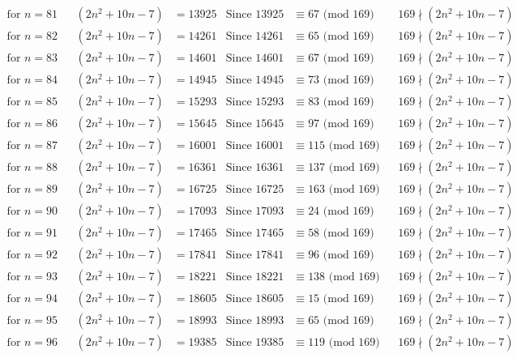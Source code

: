 \documentclass[12pt]{article}
\begin{document}
\begin{align*}
\text{for $n = 81 $}&& (2n^2+10n-7) &= 13925 & \text{Since } 13925  &\equiv  67 \text{ (mod $169$)}&& 169 \nmid (2n^2+10n-7)\\
\text{for $n = 82 $}&& (2n^2+10n-7) &= 14261 & \text{Since } 14261  &\equiv  65 \text{ (mod $169$)}&& 169 \nmid (2n^2+10n-7)\\
\text{for $n = 83 $}&& (2n^2+10n-7) &= 14601 & \text{Since } 14601  &\equiv  67 \text{ (mod $169$)}&& 169 \nmid (2n^2+10n-7)\\
\text{for $n = 84 $}&& (2n^2+10n-7) &= 14945 & \text{Since } 14945  &\equiv  73 \text{ (mod $169$)}&& 169 \nmid (2n^2+10n-7)\\
\text{for $n = 85 $}&& (2n^2+10n-7) &= 15293 & \text{Since } 15293  &\equiv  83 \text{ (mod $169$)}&& 169 \nmid (2n^2+10n-7)\\
\text{for $n = 86 $}&& (2n^2+10n-7) &= 15645 & \text{Since } 15645  &\equiv  97 \text{ (mod $169$)}&& 169 \nmid (2n^2+10n-7)\\
\text{for $n = 87 $}&& (2n^2+10n-7) &= 16001 & \text{Since } 16001  &\equiv  115 \text{ (mod $169$)}&& 169 \nmid (2n^2+10n-7)\\
\text{for $n = 88 $}&& (2n^2+10n-7) &= 16361 & \text{Since } 16361  &\equiv  137 \text{ (mod $169$)}&& 169 \nmid (2n^2+10n-7)\\
\text{for $n = 89 $}&& (2n^2+10n-7) &= 16725 & \text{Since } 16725  &\equiv  163 \text{ (mod $169$)}&& 169 \nmid (2n^2+10n-7)\\
\text{for $n = 90 $}&& (2n^2+10n-7) &= 17093 & \text{Since } 17093  &\equiv  24 \text{ (mod $169$)}&& 169 \nmid (2n^2+10n-7)\\
\text{for $n = 91 $}&& (2n^2+10n-7) &= 17465 & \text{Since } 17465  &\equiv  58 \text{ (mod $169$)}&& 169 \nmid (2n^2+10n-7)\\
\text{for $n = 92 $}&& (2n^2+10n-7) &= 17841 & \text{Since } 17841  &\equiv  96 \text{ (mod $169$)}&& 169 \nmid (2n^2+10n-7)\\
\text{for $n = 93 $}&& (2n^2+10n-7) &= 18221 & \text{Since } 18221  &\equiv  138 \text{ (mod $169$)}&& 169 \nmid (2n^2+10n-7)\\
\text{for $n = 94 $}&& (2n^2+10n-7) &= 18605 & \text{Since } 18605  &\equiv  15 \text{ (mod $169$)}&& 169 \nmid (2n^2+10n-7)\\
\text{for $n = 95 $}&& (2n^2+10n-7) &= 18993 & \text{Since } 18993  &\equiv  65 \text{ (mod $169$)}&& 169 \nmid (2n^2+10n-7)\\
\text{for $n = 96 $}&& (2n^2+10n-7) &= 19385 & \text{Since } 19385  &\equiv  119 \text{ (mod $169$)}&& 169 \nmid (2n^2+10n-7)\\

\end{align*}
\end{document}

